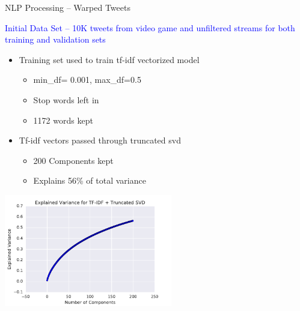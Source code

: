 \documentclass[aspectratio=169]{beamer}
\begin{document}
\begin{frame}{NLP Processing -- Warped Tweets}
  \begin{center}
    \textcolor{blue}{Initial Data Set -- 10K tweets from video game
      and unfiltered streams for both  training and validation sets}
  \end{center}

  \begin{multicols}{2}
  \begin{itemize}
  \item Training set used to train tf-idf vectorized model
    \begin{itemize}
    \item min\_df= 0.001, max\_df=0.5
    \item Stop words left in
    \item 1172 words kept
    \end{itemize}
  \item Tf-idf vectors passed through truncated svd
    \begin{itemize}
    \item 200 Components kept
    \item Explains 56\% of total variance
    \end{itemize}
  \end{itemize}

  \includegraphics[width=0.55\textwidth]{variation.pdf}
  \end{multicols}

 
\end{frame}
\end{document}
